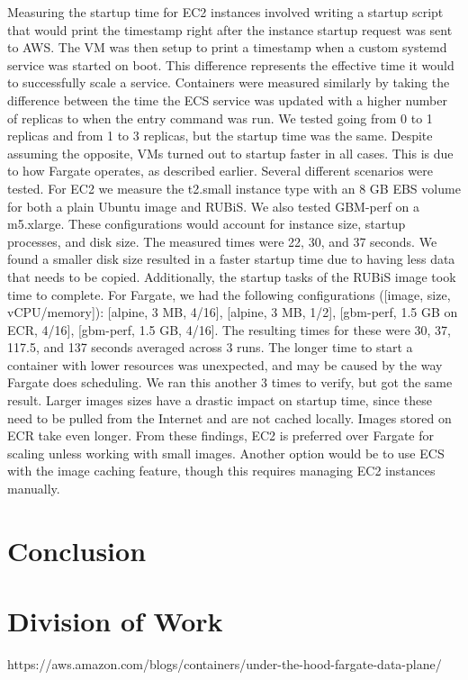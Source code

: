 \documentclass[11pt]{article}
\begin{document}
Measuring the startup time for EC2 instances involved writing a startup script that would print the timestamp right after the instance startup request was sent to AWS. The VM was then setup to print a timestamp when a custom systemd service was started on boot. This difference represents the effective time it would to successfully scale a service. Containers were measured similarly by taking the difference between the time the ECS service was updated with a higher number of replicas to when the entry command was run. We tested going from 0 to 1 replicas and from 1 to 3 replicas, but the startup time was the same. Despite assuming the opposite, VMs turned out to startup faster in all cases. This is due to how Fargate operates, as described earlier. Several different scenarios were tested. For EC2 we measure the t2.small instance type with an 8 GB EBS volume for both a plain Ubuntu image and RUBiS. We also tested GBM-perf on a m5.xlarge. These configurations would account for instance size, startup processes, and disk size. The measured times were 22, 30, and 37 seconds. We found a smaller disk size resulted in a faster startup time due to having less data that needs to be copied. Additionally, the startup tasks of the RUBiS image took time to complete. For Fargate, we had the following configurations ([image, size, vCPU/memory]): [alpine, 3 MB, 4/16], [alpine, 3 MB, 1/2], [gbm-perf, 1.5 GB on ECR, 4/16], [gbm-perf, 1.5 GB, 4/16]. The resulting times for these were 30, 37, 117.5, and 137 seconds averaged across 3 runs. The longer time to start a container with lower resources was unexpected, and may be caused by the way Fargate does scheduling. We ran this another 3 times to verify, but got the same result. Larger images sizes have a drastic impact on startup time, since these need to be pulled from the Internet and are not cached locally. Images stored on ECR take even longer. From these findings, EC2 is preferred over Fargate for scaling unless working with small images. Another option would be to use ECS with the image caching feature, though this requires managing EC2 instances manually.


\section{Conclusion}


\section{Division of Work}



https://aws.amazon.com/blogs/containers/under-the-hood-fargate-data-plane/
\end{document}
